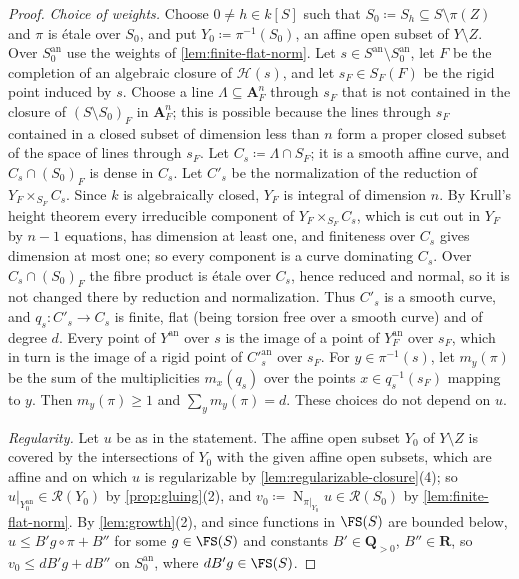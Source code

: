 \documentclass[11pt,a4paper]{article}
\newcommand{\an}{\mathrm{an}}          %
\newcommand{\Norm}{\operatorname{N}}
\begin{document}
\begin{proof}
\emph{Choice of weights.} Choose $0\ne h\in k[S]$ such that $S_0\coloneqq S_h\subseteq S\setminus\pi(Z)$ and $\pi$ is \'etale over $S_0$, and put $Y_0\coloneqq\pi^{-1}(S_0)$, an affine open subset of $Y\setminus Z$. Over $S_0^{\an}$ use the weights of \cref{lem:finite-flat-norm}. Let $s\in S^{\an}\setminus S_0^{\an}$, let $F$ be the completion of an algebraic closure of $\mathcal H(s)$, and let $s_F\in S_F(F)$ be the rigid point induced by $s$. Choose a line $\Lambda\subseteq\mathbf A^n_F$ through $s_F$ that is not contained in the closure of $(S\setminus S_0)_F$ in $\mathbf A^n_F$; this is possible because the lines through $s_F$ contained in a closed subset of dimension less than $n$ form a proper closed subset of the space of lines through $s_F$. Let $C_s\coloneqq\Lambda\cap S_F$; it is a smooth affine curve, and $C_s\cap(S_0)_F$ is dense in $C_s$. Let $C'_s$ be the normalization of the reduction of $Y_F\times_{S_F}C_s$. Since $k$ is algebraically closed, $Y_F$ is integral of dimension $n$. By Krull's height theorem every irreducible component of $Y_F\times_{S_F}C_s$, which is cut out in $Y_F$ by $n-1$ equations, has dimension at least one, and finiteness over $C_s$ gives dimension at most one; so every component is a curve dominating $C_s$. Over $C_s\cap(S_0)_F$ the fibre product is \'etale over $C_s$, hence reduced and normal, so it is not changed there by reduction and normalization. Thus $C'_s$ is a smooth curve, and $q_s\colon C'_s\to C_s$ is finite, flat (being torsion free over a smooth curve) and of degree $d$. Every point of $Y^{\an}$ over $s$ is the image of a point of $Y_F^{\an}$ over $s_F$, which in turn is the image of a rigid point of $C'^{\an}_s$ over $s_F$. For $y\in\pi^{-1}(s)$, let $m_y(\pi)$ be the sum of the multiplicities $m_{x}(q_s)$ over the points $x\in q_s^{-1}(s_F)$ mapping to $y$. Then $m_y(\pi)\ge1$ and $\sum_ym_y(\pi)=d$. These choices do not depend on $u$.

\emph{Regularity.} Let $u$ be as in the statement. The affine open subset $Y_0$ of $Y\setminus Z$ is covered by the intersections of $Y_0$ with the given affine open subsets, which are affine and on which $u$ is regularizable by \cref{lem:regularizable-closure}(4); so $u|_{Y_0^{\an}}\in\mathcal{R}(Y_0)$ by \cref{prop:gluing}(2), and $v_0\coloneqq\Norm_{\pi|_{Y_0}}u\in\mathcal{R}(S_0)$ by \cref{lem:finite-flat-norm}. By \cref{lem:growth}(2), and since functions in $\FS(S)$ are bounded below, $u\le B'g\circ\pi+B''$ for some $g\in\FS(S)$ and constants $B'\in\mathbf Q_{>0}$, $B''\in\mathbf R$, so $v_0\le dB'g+dB''$ on $S_0^{\an}$, where $dB'g\in\FS(S)$.


\end{proof}
\end{document}
